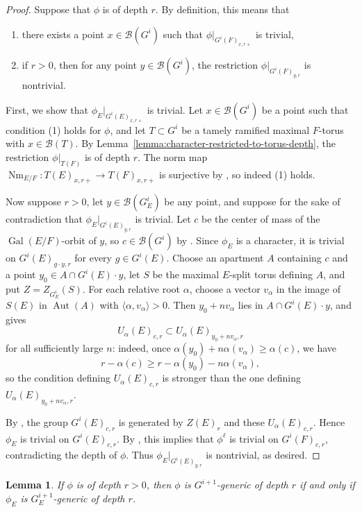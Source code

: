 \documentclass[reqno]{amsart}
\numberwithin{equation}{subsection}
\newcommand{\Gal}{\operatorname{Gal}}
\newcommand\cB{\mathcal{B}}
\DeclareMathOperator{\Aut}{Aut}
\DeclareMathOperator{\Nm}{Nm}
\newtheorem{lemma}[thm]{Lemma}
\theoremstyle{remark}
\numberwithin{equation}{subsection}
\numberwithin{figure}{subsection}
\begin{document}
\begin{proof}
Suppose that $\phi$ is of depth $r$. By definition, this means that
\begin{enumerate}
    \item there exists a point $x \in \cB(G^i)$ such that $\phi|_{G^i(F)_{x,r+}}$ is trivial,
    \item if $r> 0$, then for any point $y \in \cB(G^i)$, the restriction $\phi|_{G^i(F)_{y,r}}$ is nontrivial.
\end{enumerate}
First, we show that $\phi_E|_{G^i(E)_{x,r+}}$ is trivial. Let $x \in \cB(G^i)$ be a point such that condition (1) holds for $\phi$, and let $T \subset G^i$ be a tamely ramified maximal $F$-torus with $x \in \cB(T)$. By Lemma~\ref{lemma:character-restricted-to-torus-depth}, the restriction $\phi|_{T(F)}$ is of depth $r$. The norm map $\Nm_{E/F}\colon T(E)_{x,r+} \to T(F)_{x,r+}$ is surjective by \cite[Lemma 3.1.3]{Kal19}, so indeed (1) holds.

Now suppose $r > 0$, let $y \in \cB(G^i_E)$ be any point, and suppose for the sake of contradiction that $\phi_E|_{G^i(E)_{y,r}}$ is trivial. Let $c$ be the center of mass of the $\Gal(E/F)$-orbit of $y$, so $c\in\cB(G^i)$ by \cite[Theorem 12.9.2]{KP}. Since $\phi_E$ is a character, it is trivial on $G^i(E)_{g\cdot y,r}$ for every $g\in G^i(E)$. Choose an apartment $A$ containing $c$ and a point $y_0\in A\cap G^i(E)\cdot y$, let $S$ be the maximal $E$-split torus defining $A$, and put $Z=Z_{G^i_E}(S)$. For each relative root $\alpha$, choose a vector $v_\alpha$ in the image of $S(E)$ in $\Aut(A)$ with $\langle \alpha, v_\alpha\rangle>0$. Then $y_0+n v_\alpha$ lies in $A\cap G^i(E)\cdot y$, and \cite[Lemma 6.1.6]{KP} gives
\[
U_\alpha(E)_{c,r}\subset U_\alpha(E)_{y_0+n v_\alpha,r}
\]
for all sufficiently large $n$: indeed, once $\alpha(y_0)+n\alpha(v_\alpha)\geq\alpha(c)$, we have
\[
r-\alpha(c)\geq r-\alpha(y_0)-n\alpha(v_\alpha),
\]
so the condition defining $U_\alpha(E)_{c,r}$ is stronger than the one defining $U_\alpha(E)_{y_0+n v_\alpha,r}$.

By \cite[Definition 13.2.1]{KP}, the group $G^i(E)_{c,r}$ is generated by $Z(E)_r$ and these $U_\alpha(E)_{c,r}$. Hence $\phi_E$ is trivial on $G^i(E)_{c,r}$. By \cite[Proposition 12.9.4]{KP}, this implies that $\phi^\ell$ is trivial on $G^i(F)_{c,r}$, contradicting the depth of $\phi$. Thus $\phi_E|_{G^i(E)_{y,r}}$ is nontrivial, as desired.
\end{proof}

\begin{lemma}\label{lemma:generic-stays-same}
If $\phi$ is of depth $r > 0$, then $\phi$ is $G^{i+1}$-generic of depth $r$ if and only if $\phi_E$ is $G^{i+1}_E$-generic of depth $r$.
\end{lemma}
\end{document}
